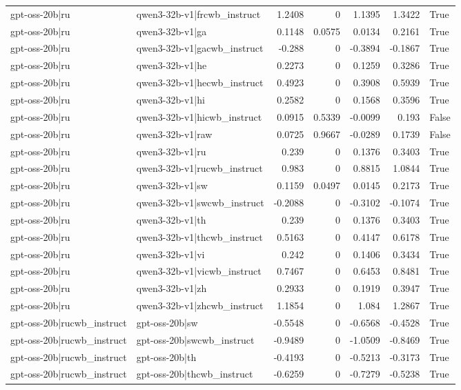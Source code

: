 \begin{table}
\begin{tabular}{l l r r r r l}
gpt-oss-20b|ru & qwen3-32b-v1|frcwb_instruct & 1.2408 & 0 & 1.1395 & 1.3422 & True \\
gpt-oss-20b|ru & qwen3-32b-v1|ga & 0.1148 & 0.0575 & 0.0134 & 0.2161 & True \\
gpt-oss-20b|ru & qwen3-32b-v1|gacwb_instruct & -0.288 & 0 & -0.3894 & -0.1867 & True \\
gpt-oss-20b|ru & qwen3-32b-v1|he & 0.2273 & 0 & 0.1259 & 0.3286 & True \\
gpt-oss-20b|ru & qwen3-32b-v1|hecwb_instruct & 0.4923 & 0 & 0.3908 & 0.5939 & True \\
gpt-oss-20b|ru & qwen3-32b-v1|hi & 0.2582 & 0 & 0.1568 & 0.3596 & True \\
gpt-oss-20b|ru & qwen3-32b-v1|hicwb_instruct & 0.0915 & 0.5339 & -0.0099 & 0.193 & False \\
gpt-oss-20b|ru & qwen3-32b-v1|raw & 0.0725 & 0.9667 & -0.0289 & 0.1739 & False \\
gpt-oss-20b|ru & qwen3-32b-v1|ru & 0.239 & 0 & 0.1376 & 0.3403 & True \\
gpt-oss-20b|ru & qwen3-32b-v1|rucwb_instruct & 0.983 & 0 & 0.8815 & 1.0844 & True \\
gpt-oss-20b|ru & qwen3-32b-v1|sw & 0.1159 & 0.0497 & 0.0145 & 0.2173 & True \\
gpt-oss-20b|ru & qwen3-32b-v1|swcwb_instruct & -0.2088 & 0 & -0.3102 & -0.1074 & True \\
gpt-oss-20b|ru & qwen3-32b-v1|th & 0.239 & 0 & 0.1376 & 0.3403 & True \\
gpt-oss-20b|ru & qwen3-32b-v1|thcwb_instruct & 0.5163 & 0 & 0.4147 & 0.6178 & True \\
gpt-oss-20b|ru & qwen3-32b-v1|vi & 0.242 & 0 & 0.1406 & 0.3434 & True \\
gpt-oss-20b|ru & qwen3-32b-v1|vicwb_instruct & 0.7467 & 0 & 0.6453 & 0.8481 & True \\
gpt-oss-20b|ru & qwen3-32b-v1|zh & 0.2933 & 0 & 0.1919 & 0.3947 & True \\
gpt-oss-20b|ru & qwen3-32b-v1|zhcwb_instruct & 1.1854 & 0 & 1.084 & 1.2867 & True \\
gpt-oss-20b|rucwb_instruct & gpt-oss-20b|sw & -0.5548 & 0 & -0.6568 & -0.4528 & True \\
gpt-oss-20b|rucwb_instruct & gpt-oss-20b|swcwb_instruct & -0.9489 & 0 & -1.0509 & -0.8469 & True \\
gpt-oss-20b|rucwb_instruct & gpt-oss-20b|th & -0.4193 & 0 & -0.5213 & -0.3173 & True \\
gpt-oss-20b|rucwb_instruct & gpt-oss-20b|thcwb_instruct & -0.6259 & 0 & -0.7279 & -0.5238 & True \\

\end{tabular}
\end{table}
